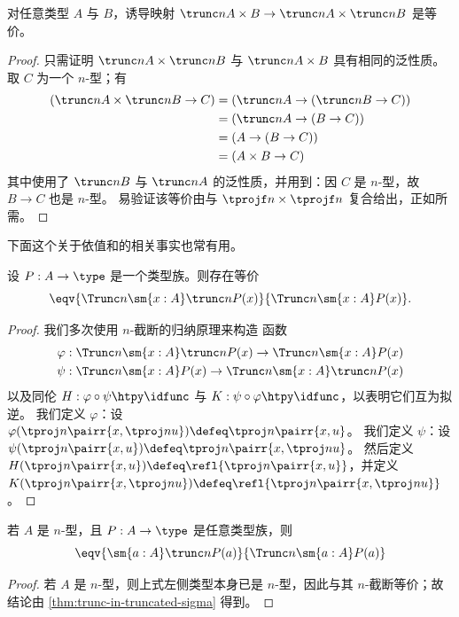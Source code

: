 \begin{thm}\label{cor:trunc-prod}
  对任意类型 $A$ 与 $B$，诱导映射 $\trunc n{A\times B} \to \trunc nA \times \trunc nB$ 是等价。
\end{thm}
\begin{proof}
  只需证明 $\trunc nA \times \trunc nB$ 与 $\trunc n{A\times B}$ 具有相同的泛性质。
  取 $C$ 为一个 $n$-型；有
  \begin{align*}
    (\trunc nA \times \trunc nB \to C)
    &= (\trunc nA \to (\trunc nB \to C))\\
    &= (\trunc nA \to (B \to C))\\
    &= (A \to (B \to C))\\
    &= (A \times B \to C)
  \end{align*}
  其中使用了 $\trunc nB$ 与 $\trunc nA$ 的泛性质，并用到：因 $C$ 是 $n$-型，故 $B\to C$ 也是 $n$-型。
  易验证该等价由与 $\tprojf n \times \tprojf n$ 复合给出，正如所需。
\end{proof}

下面这个关于依值和的相关事实也常有用。

\begin{thm}\label{thm:trunc-in-truncated-sigma}
设 $P:A\to\type$ 是一个类型族。则存在等价
\begin{equation*}
\eqv{\Trunc n{\sm{x:A}\trunc n{P(x)}}}{\Trunc n{\sm{x:A}P(x)}}.
\end{equation*}
\end{thm}

\begin{proof}
我们多次使用 $n$-截断的归纳原理来构造
函数
\begin{align*}
\varphi & : \Trunc n{\sm{x:A}\trunc n{P(x)}}\to\Trunc n{\sm{x:A}P(x)}\\
\psi & : \Trunc n{\sm{x:A}P(x)}\to \Trunc n{\sm{x:A} \trunc n{P(x)}}
\end{align*}
以及同伦 $H:\varphi\circ\psi\htpy \idfunc$ 与 $K:\psi\circ\varphi\htpy
\idfunc$，以表明它们互为拟逆。
我们定义 $\varphi$：设 $\varphi(\tproj n{\pairr{x,\tproj nu}})\defeq\tproj n{\pairr{x,u}}$。
我们定义 $\psi$：设 $\psi(\tproj n{\pairr{x,u}})\defeq\tproj n{\pairr{x,\tproj nu}}$。
然后定义 $H(\tproj n{\pairr{x,u}})\defeq \refl{\tproj n{\pairr{x,u}}}$，并定义
$K(\tproj n{\pairr{x,\tproj nu}})\defeq \refl{\tproj n{\pairr{x,\tproj nu}}}$。
\end{proof}

\begin{cor}\label{thm:refl-over-ntype-base}
  若 $A$ 是 $n$-型，且 $P:A\to\type$ 是任意类型族，则
  \[ \eqv{\sm{a:A} \trunc n{P(a)}}{\Trunc n{\sm{a:A}P(a)}} \]
\end{cor}
\begin{proof}
  若 $A$ 是 $n$-型，则上式左侧类型本身已是 $n$-型，因此与其 $n$-截断等价；故结论由 \cref{thm:trunc-in-truncated-sigma} 得到。
\end{proof}

